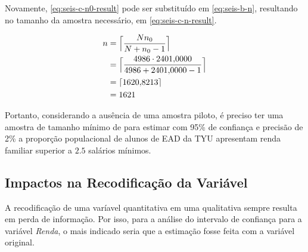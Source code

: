 	Novamente, \eqref{eq:seis-c-n0-result} pode ser substituído em
	\eqref{eq:seis-b-n}, resultando no tamanho da amostra necessário, em
	\eqref{eq:seis-c-n-result}.

	\begin{align}
		n &= \Big\lceil \frac{N n_0}{N + n_0 - 1} \nonumber \Big\rceil \\
		  &= \Big\lceil \frac{4986 \cdot \num{2401.0000}}{4986 + \num{2401.0000} - 1} \Big\rceil \nonumber \\
		  &= \lceil \num{1620.8213} \rceil \nonumber \\
		  &= \label{eq:seis-c-n-result} 
			 1621
	\end{align}

	Portanto, considerando a ausência de uma amostra piloto, é preciso ter uma
	amostra de tamanho mínimo de \SEISCnceil para estimar com 95\% de
	confiança e precisão de 2\% a proporção populacional de alunos de EAD da TYU
	apresentam renda familiar superior a $\num{2,5}$ salários mínimos.

\subsection{Impactos na Recodificação da Variável}
	
	A recodificação de uma varíavel quantitativa em uma qualitativa sempre
	resulta em perda de informação. Por isso, para a análise do intervalo de
	confiança para a variável \textit{Renda}, o mais indicado seria que a
	estimação fosse feita com a variável original.
